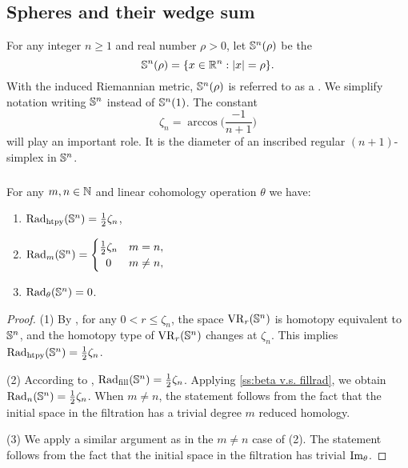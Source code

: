 
\subsection{Spheres and their wedge sum}\label{ss:Sn}\label{sub:Sn and wedge sum}

For any integer $n \geq 1$ and real number $\rho > 0$, let $\mathbb{S}^n(\rho)$ be the 
\[
\mathbb{S}^n(\rho) = \{x \in \mathbb{R}^n : \lvert x\rvert = \rho\}.
\]
With the induced Riemannian metric, \(\mathbb{S}^n(\rho)\) is referred to as a .
We simplify notation writing \(\mathbb{S}^n\) instead of \(\mathbb{S}^n(1)\).
The constant
\[\zeta_n = \arccos\Big(\frac{-1}{n+1}\Big)\]
will play an important role.
It is the diameter of an inscribed regular $(n+1)$-simplex in $\mathbb{S}^n$.

\subsubsection{}\label{ss:critical values of Sn}

\lemma
For any $m,n \in \mathbb{N}$ and linear cohomology operation $\theta$ we have:
\begin{enumerate}
	\item \(\mathrm{Rad}_{\mathrm{htpy}}(\mathbb{S}^n) = \frac{1}{2}\zeta_n\),
	\item \(\firstdeath{m}{\bS^n} =
	\begin{cases}
		\frac{1}{2}\zeta_n & m = n, \\
		\hfil 0 & m \neq n,
	\end{cases}\)
	\item \(\mathrm{Rad}_{\theta}(\mathbb{S}^n) = 0\).
\end{enumerate}

\begin{proof}
	(1) By \cite[Thm.~7.1]{lim2024vietoris}, for any $0 < r \leq \zeta_n$, the space $\mathrm{VR}_r(\mathbb{S}^n)$ is homotopy equivalent to $\mathbb{S}^n$, and the homotopy type of $\mathrm{VR}_r(\mathbb{S}^n)$ changes at $\zeta_n$.
	This implies $\mathrm{Rad}_{\mathrm{htpy}}(\mathbb{S}^n)=\frac{1}{2}\zeta_n$.

	\smallskip (2) According to \cite{katz1983filling}, \(\mathrm{Rad}_{\mathrm{fill}}(\mathbb{S}^n) = \frac{1}{2}\zeta_n\).
	Applying \cref{ss:beta v.s. fillrad}, we obtain \(\mathrm{Rad}_{n}(\mathbb{S}^n) = \frac{1}{2}\zeta_n\).
    When $m\neq n$, the statement follows from the fact that the initial space in the filtration has a trivial degree $m$ reduced homology.

	\smallskip (3) We apply a similar argument as in the $m\neq n$ case of (2). The statement follows from the fact that the initial space in the filtration has trivial $\operatorname{Im}_\theta$.
\end{proof}


